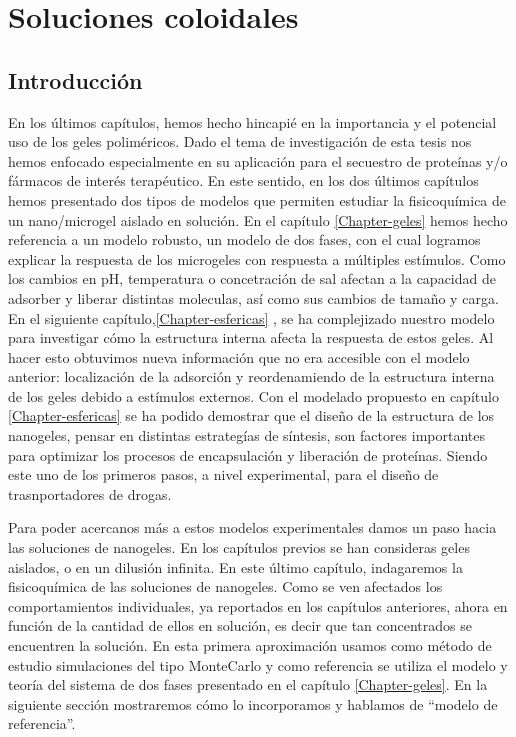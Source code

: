 \chapter{Soluciones coloidales}

\section{Introducci\'on}

En los \'ultimos cap\'itulos, hemos hecho hincapi\'e en la importancia y el potencial uso de los geles polim\'ericos. Dado el tema de investigaci\'on de esta tesis nos hemos enfocado especialmente en su aplicaci\'on para el secuestro de prote\'inas y/o f\'armacos de inter\'es terap\'eutico.
En este sentido, en los dos \'ultimos cap\'itulos hemos presentado dos tipos de modelos que permiten estudiar la fisicoqu\'imica de un nano/microgel aislado en soluci\'on.
En el cap\'itulo  \ref{Chapter-geles} hemos hecho referencia a un modelo robusto, un modelo de dos fases, con el cual logramos explicar la respuesta de los microgeles con respuesta a  m\'ultiples est\'imulos. Como los cambios en pH, temperatura o concetraci\'on de sal afectan a la capacidad de adsorber y liberar distintas moleculas, as\'i como sus cambios de tama\~no y carga. 
En el siguiente cap\'itulo,\ref{Chapter-esfericas} , se ha complejizado nuestro modelo para investigar c\'omo la estructura interna afecta la respuesta de estos geles. Al hacer esto obtuvimos nueva informaci\'on que no era accesible con el modelo anterior: localizaci\'on de la adsorci\'on y reordenamiendo de la estructura interna de los geles debido a est\'imulos externos.
Con el modelado propuesto en cap\'itulo \ref{Chapter-esfericas}  se ha podido  demostrar  que el dise\~no de la estructura de los nanogeles,  pensar en distintas estrateg\'ias de  s\'intesis, son factores importantes para optimizar los procesos de encapsulaci\'on y liberaci\'on de prote\'inas. 
Siendo este uno de los primeros pasos, a nivel experimental, para el dise\~no de trasnportadores de drogas.

Para poder acercanos m\'as a estos modelos experimentales damos un paso hacia las soluciones de nanogeles. En los cap\'itulos previos se han consideras geles aislados, o en un dilusi\'on infinita.
En este \'ultimo cap\'itulo,  indagaremos la fisicoqu\'imica de las soluciones de nanogeles. Como se ven afectados los comportamientos individuales, ya reportados en los cap\'itulos anteriores, ahora en funci\'on de la cantidad de ellos en soluci\'on, es decir que tan concentrados se encuentren la soluci\'on.
En esta primera aproximaci\'on usamos como m\'etodo de estudio simulaciones del tipo MonteCarlo y como referencia se utiliza el modelo y teor\'ia del sistema de dos fases presentado en el cap\'itulo \ref{Chapter-geles}. En la siguiente secci\'on mostraremos c\'omo lo incorporamos y hablamos de ``modelo de referencia''. 

